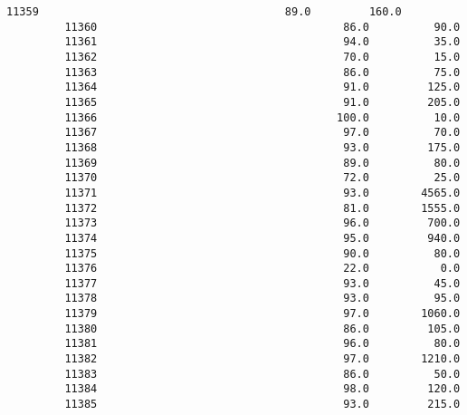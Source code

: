 \documentclass[11pt]{article}
\begin{document}
\begin{Verbatim}[commandchars=\\\{\}]
         11359                                      89.0         160.0   
         11360                                      86.0          90.0   
         11361                                      94.0          35.0   
         11362                                      70.0          15.0   
         11363                                      86.0          75.0   
         11364                                      91.0         125.0   
         11365                                      91.0         205.0   
         11366                                     100.0          10.0   
         11367                                      97.0          70.0   
         11368                                      93.0         175.0   
         11369                                      89.0          80.0   
         11370                                      72.0          25.0   
         11371                                      93.0        4565.0   
         11372                                      81.0        1555.0   
         11373                                      96.0         700.0   
         11374                                      95.0         940.0   
         11375                                      90.0          80.0   
         11376                                      22.0           0.0   
         11377                                      93.0          45.0   
         11378                                      93.0          95.0   
         11379                                      97.0        1060.0   
         11380                                      86.0         105.0   
         11381                                      96.0          80.0   
         11382                                      97.0        1210.0   
         11383                                      86.0          50.0   
         11384                                      98.0         120.0   
         11385                                      93.0         215.0   
         

\end{Verbatim}
\end{document}
